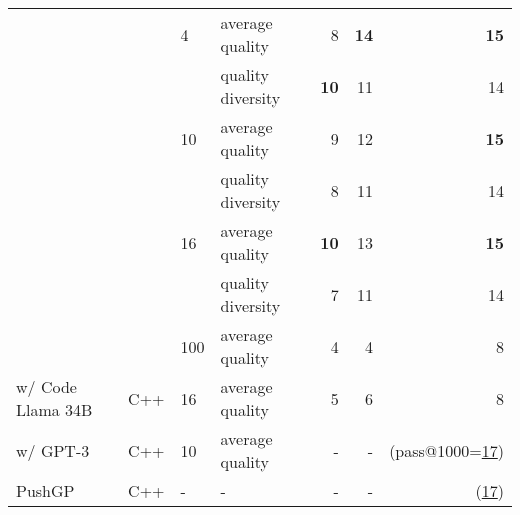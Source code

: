 \begin{table}
\begin{tabular}{llllrrr}
  &     & 4   & average quality &       8 &       \textbf{14} &        \textbf{15} \\
  &     &     & quality diversity  &      \textbf{10} &       11 &        14 \\
  &     & 10  & average quality &       9 &       12 &        \textbf{15} \\
  &     &     & quality diversity  &       8 &       11 &        14 \\
  &     & 16  & average quality &      \textbf{10} &       13 &        \textbf{15} \\
  &     &     & quality diversity  &       7 &       11 &        14 \\
  &     & 100 & average quality &       4 &        4 &         8 \\
  \midrule
\method{} w/ Code Llama 34B & C++ &  16  & average quality  &    5 &        6 &         8 \\
\method{} w/ GPT-3 & C++  & 10 & average quality &       - &        - &      (pass@1000=\underline{17})\\
\midrule
PushGP & C++ &  -   &    -            &       - &        - &      (\underline{17})\\

\bottomrule
\end{tabular}
\end{table}




